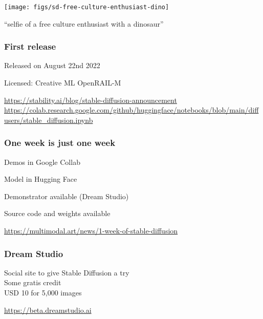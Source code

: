 \documentclass[17pt,aspectratio=169,hyperref={pdfusetitle,colorlinks,allcolors=olive}]{beamer}
\begin{document}
\begin{frame}[fragile]

  \texttt{[image: figs/sd-free-culture-enthusiast-dino]}

  {\small
  ``selfie of a free culture enthusiast with a dinosaur''
}  
\end{frame}


\begin{frame}[fragile]
  \frametitle{First release}

  Released on August 22nd 2022

  Licensed: Creative ML OpenRAIL-M

  \begin{flushright}
    {\scriptsize
    \url{https://stability.ai/blog/stable-diffusion-announcement} \\
    \url{https://colab.research.google.com/github/huggingface/notebooks/blob/main/diffusers/stable_diffusion.ipynb} \\
    }
  \end{flushright}
\end{frame}


\begin{frame}[fragile]
  \frametitle{One week is just one week}


  Demos in Google Collab

  Model in Hugging Face

  Demonstrator available (Dream Studio)
  
  Source code and weights available
  
    \begin{flushright}
    {\scriptsize
    \url{https://multimodal.art/news/1-week-of-stable-diffusion} \\
    }
  \end{flushright}

\end{frame}

\begin{frame}[fragile]
  \frametitle{Dream Studio}

  Social site to give Stable Diffusion a try \\
  Some gratis credit \\
  USD 10 for 5,000 images \\

  \begin{flushright}
    {
    \url{https://beta.dreamstudio.ai} \\
    }
  \end{flushright}
\end{frame}
\end{document}
